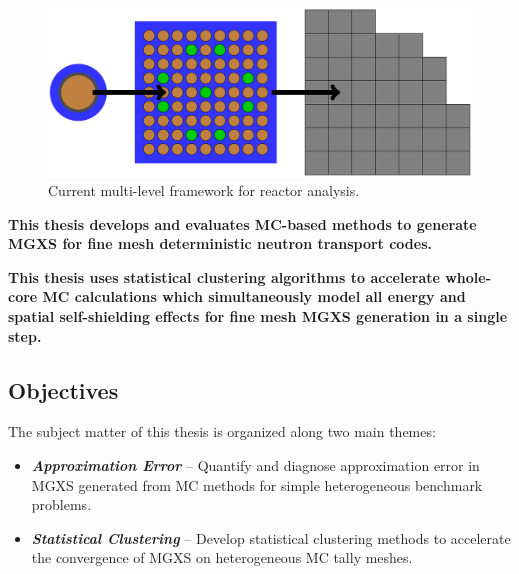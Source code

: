 \documentclass[12pt,twoside]{mitthesis-exec}
\begin{document}
\begin{figure}[h!]
\centering
\includegraphics[width=0.9\linewidth]{figures/intro/multi-step-flow-chart}
\caption[Multi-level approach to reactor analysis]{Current multi-level framework for reactor analysis.}
\label{fig:multi-level-flow-chart}
\end{figure}

\begin{emphbox}
\textbf{This thesis develops and evaluates MC-based methods to generate MGXS for fine mesh deterministic neutron transport codes.}
\end{emphbox}

\begin{emphbox}
\textbf{This thesis uses statistical clustering algorithms to accelerate whole-core MC calculations
which simultaneously model all energy and spatial self-shielding effects for fine mesh MGXS generation in a single step.}
\end{emphbox}

\clearpage

\subsection*{Objectives}

The subject matter of this thesis is organized along two main themes:

\begin{itemize}
\item \textbf{\textit{Approximation Error}} -- Quantify and diagnose approximation error in MGXS generated from MC methods for simple heterogeneous benchmark problems.
\item \textbf{\textit{Statistical Clustering}} -- Develop statistical clustering methods to accelerate the convergence of MGXS on heterogeneous MC tally meshes.
\end{itemize}

\clearpage

\end{document}
